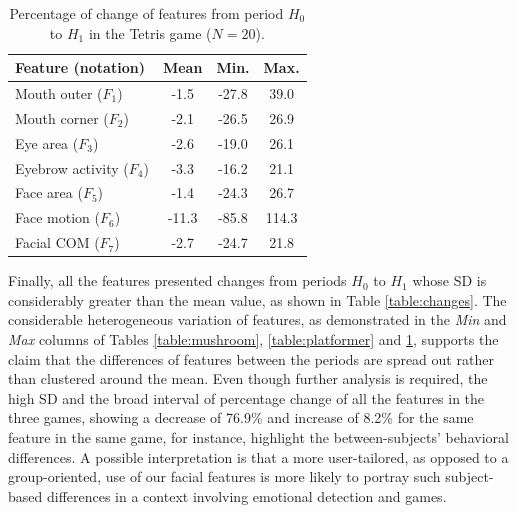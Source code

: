 \begin{table}
    \caption{Percentage of change of features from period $H_0$ to $H_1$ in the Tetris game ($N=20$).}
    \label{table:tetris}
    \centering
    \begin{threeparttable}
        \begin{tabular}{lccc}
            \toprule%
                \textbf{Feature (notation)} & \textbf{Mean} & \textbf{Min.} & \textbf{Max.} \\
            \midrule%
                Mouth outer ($F_1$)      & -1.5  & -27.8 & 39.0  \\
                Mouth corner ($F_2$)     & -2.1  & -26.5 & 26.9  \\
                Eye area ($F_3$)         & -2.6  & -19.0 & 26.1  \\
                Eyebrow activity ($F_4$) & -3.3  & -16.2 & 21.1  \\
                Face area ($F_5$)        & -1.4  & -24.3 & 26.7  \\
                Face motion ($F_6$)      & -11.3 & -85.8 & 114.3 \\
                Facial COM ($F_7$)       & -2.7  & -24.7 & 21.8  \\
            \bottomrule%
        \end{tabular}
        \begin{tablenotes}
          \small
          \item[]{}
        \end{tablenotes}
    \end{threeparttable}
\end{table}

Finally, all the features presented changes from periods $H_0$ to $H_1$ whose SD is considerably greater than the mean value, as shown in Table \ref{table:changes}. The considerable heterogeneous variation of features, as demonstrated in the \textit{Min} and \textit{Max} columns of Tables \ref{table:mushroom}, \ref{table:platformer} and \ref{table:tetris}, supports the claim that the differences of features between the periods are spread out rather than clustered around the mean. Even though further analysis is required, the high SD and the broad interval of percentage change of all the features in the three games, showing a decrease of 76.9\% and increase of 8.2\% for the same feature in the same game, for instance, highlight the between-subjects' behavioral differences. A possible interpretation is that a more user-tailored, as opposed to a group-oriented, use of our facial features is more likely to portray such subject-based differences in a context involving emotional detection and games.

